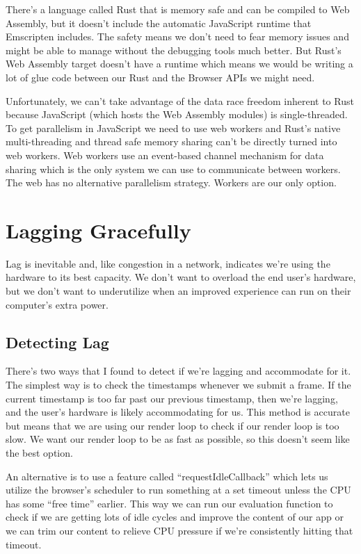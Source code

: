 \documentclass[draftclsnofoot,onecolumn]{IEEEtran}
\begin{document}
There’s a language called Rust that is memory safe and can be compiled to Web Assembly, but it doesn’t include the automatic JavaScript runtime that Emscripten includes\cite{WEBSITE:7}.  The safety means we don’t need to fear memory issues and might be able to manage without the debugging tools much better.  But Rust’s Web Assembly target doesn’t have a runtime which means we would be writing a lot of glue code between our Rust and the Browser APIs we might need.

Unfortunately, we can’t take advantage of the data race freedom inherent to Rust because JavaScript (which hosts the Web Assembly modules) is single-threaded.  To get parallelism in JavaScript we need to use web workers and Rust’s native multi-threading and thread safe memory sharing can’t be directly turned into web workers.  Web workers use an event-based channel mechanism for data sharing which is the only system we can use to communicate between workers\cite{WEBSITE:8}.  The web has no alternative parallelism strategy.  Workers are our only option.

\section{Lagging Gracefully}
Lag is inevitable and, like congestion in a network, indicates we’re using the hardware to its best capacity.  We don’t want to overload the end user’s hardware, but we don’t want to underutilize when an improved experience can run on their computer’s extra power. 
\subsection{Detecting Lag}
There’s two ways that I found to detect if we’re lagging and accommodate for it.  The simplest way is to check the timestamps whenever we submit a frame.  If the current timestamp is too far past our previous timestamp, then we’re lagging, and the user’s hardware is likely accommodating for us.  This method is accurate but means that we are using our render loop to check if our render loop is too slow.  We want our render loop to be as fast as possible, so this doesn’t seem like the best option.

An alternative is to use a feature called “requestIdleCallback” which lets us utilize the browser’s scheduler to run something at a set timeout unless the CPU has some “free time” earlier\cite{WEBSITE:9}.  This way we can run our evaluation function to check if we are getting lots of idle cycles and improve the content of our app or we can trim our content to relieve CPU pressure if we’re consistently hitting that timeout.
\end{document}
